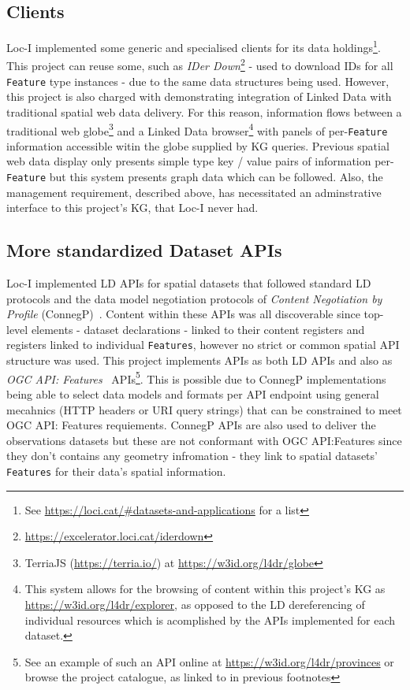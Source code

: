 \documentclass[runningheads]{llncs}
\begin{document}
\subsection{Clients}
Loc-I implemented some generic and specialised clients for its data holdings\footnote{See \url{https://loci.cat/\#datasets-and-applications} for a list}. This project can reuse some, such as 
\textit{IDer Down}\footnote{\url{https://excelerator.loci.cat/iderdown}} - used to download IDs for all \texttt{Feature} type instances - due to the same data structures being used.
However, this project is also charged with demonstrating integration of Linked Data with traditional spatial web data delivery. For this reason, information
flows between a traditional web globe\footnote{TerriaJS (\url{https://terria.io/}) at \url{https://w3id.org/l4dr/globe}}
and a Linked Data browser\footnote{This system allows for the browsing of content within this project's KG as \url{https://w3id.org/l4dr/explorer}, as opposed to the LD dereferencing of individual resources 
which is acomplished by the APIs implemented for each dataset.} with panels of per-\texttt{Feature} information accessible witin the globe supplied by KG queries. Previous spatial web data display
only presents simple type key / value pairs of information per-\texttt{Feature} but this system presents graph data which can be followed. Also, the management requirement, described above, has 
necessitated an adminstrative interface to this project's KG, that Loc-I never had.

\subsection{More standardized Dataset APIs}
Loc-I implemented LD APIs for spatial datasets that followed standard LD protocols and the data model negotiation protocols of \textit{Content Negotiation by Profile} (ConnegP)~\cite{atkinson_profiles_2020}.
Content within these APIs was all discoverable since top-level elements - dataset declarations - linked to their content registers and registers linked to individual \texttt{Features}, 
however no strict or common spatial API structure was used. This project implements APIs as both LD APIs and also as \textit{OGC API: Features}~\cite{clemens_portele_ogc_2019} APIs\footnote{See an example of such an API online at \url{https://w3id.org/l4dr/provinces} or browse the project catalogue, as linked to in previous footnotes}.
This is possible due to ConnegP implementations being able to select data models and formats per API endpoint using general mecahnics (HTTP headers or URI query strings) that can be constrained
to meet OGC API: Features requiements. ConnegP APIs are also used to deliver the observations datasets but these are not conformant with OGC API:Features since they don't contains any geometry 
infromation - they link to spatial datasets' \texttt{Features} for their data's spatial information.
\end{document}
